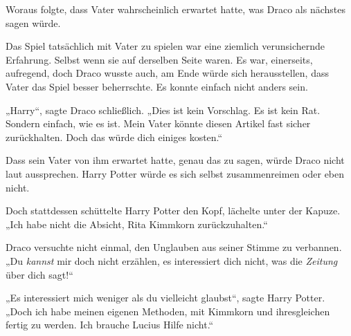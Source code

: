 Woraus folgte, dass Vater wahrscheinlich erwartet hatte, was Draco als nächstes sagen würde.

Das Spiel tatsächlich mit Vater zu spielen war eine ziemlich verunsichernde Erfahrung. Selbst wenn sie auf derselben Seite waren. Es war, einerseits, aufregend, doch Draco wusste auch, am Ende würde sich herausstellen, dass Vater das Spiel besser beherrschte. Es konnte einfach nicht anders sein.

„Harry“, sagte Draco schließlich.
„Dies ist kein Vorschlag. Es ist kein Rat. Sondern einfach, wie es ist. Mein Vater könnte diesen Artikel fast sicher zurückhalten. Doch das würde dich einiges kosten.“

Dass sein Vater von ihm erwartet hatte, genau das zu sagen, würde Draco nicht laut aussprechen. Harry Potter würde es sich selbst zusammenreimen oder eben nicht.

Doch stattdessen schüttelte Harry Potter den Kopf, lächelte unter der Kapuze.
„Ich habe nicht die Absicht, Rita Kimmkorn zurückzuhalten.“

Draco versuchte nicht einmal, den Unglauben aus seiner Stimme zu verbannen.
„Du \emph{kannst} mir doch nicht erzählen, es interessiert dich nicht, was die \emph{Zeitung} über dich sagt!“

„Es interessiert mich weniger als du vielleicht glaubst“, sagte Harry Potter.
„Doch ich habe meinen eigenen Methoden, mit Kimmkorn und ihresgleichen fertig zu werden. Ich brauche Lucius Hilfe nicht.“

